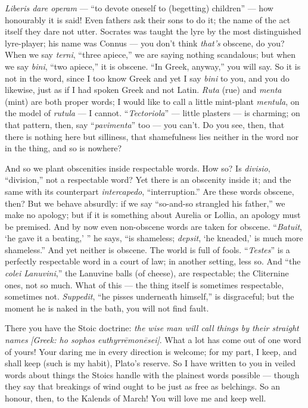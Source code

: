  \textit{Liberis dare operam} --- ``to devote oneself to (begetting) children'' --- how honourably it is said! Even fathers ask their sons to do it; the name of the act itself they dare not utter. Socrates was taught the lyre by the most distinguished lyre-player; his name was Connus --- you don't think \emph{that's} obscene, do you? When we say \textit{terni}, ``three apiece,'' we are saying nothing scandalous; but when we say \textit{bini}, ``two apiece,'' it is obscene. ``In Greek, anyway,'' you will say. So it is not in the word, since I too know Greek and yet I say \textit{bini} to you, and you do likewise, just as if I had spoken Greek and not Latin. \textit{Ruta} (rue) and \textit{menta} (mint) are both proper words; I would like to call a little mint-plant \textit{mentula}, on the model of \textit{rutula} --- I cannot. ``\textit{Tectoriola}'' --- little plasters --- is charming; on that pattern, then, say ``\textit{pavimenta}'' too --- you can't. Do you see, then, that there is nothing here but silliness, that shamefulness lies neither in the word nor in the thing, and so is nowhere?

 And so we plant obscenities inside respectable words. How so? Is \textit{divisio}, ``division,'' not a respectable word? Yet there is an obscenity inside it; and the same with its counterpart \textit{intercapedo}, ``interruption.'' Are these words obscene, then? But we behave absurdly: if we say ``so-and-so strangled his father,'' we make no apology; but if it is something about Aurelia or Lollia, an apology must be premised. And by now even non-obscene words are taken for obscene. ``\textit{Batuit}, `he gave it a beating,' '' he says, ``is shameless; \textit{depsit}, `he kneaded,' is much more shameless.'' And yet neither is obscene. The world is full of fools. ``\textit{Testes}'' is a perfectly respectable word in a court of law; in another setting, less so. And ``the \textit{colei Lanuvini},'' the Lanuvine balls (of cheese), are respectable; the Cliternine ones, not so much. What of this --- the thing itself is sometimes respectable, sometimes not. \textit{Suppedit}, ``he pisses underneath himself,'' is disgraceful; but the moment he is naked in the bath, you will not find fault.

 There you have the Stoic doctrine: \textit{the wise man will call things by their straight names} \textit{[Greek: ho sophos euthyrr\=emon\=esei]}. What a lot has come out of one word of yours! Your daring me in every direction is welcome; for my part, I keep, and shall keep (such is my habit), Plato's reserve. So I have written to you in veiled words about things the Stoics handle with the plainest words possible --- though they say that breakings of wind ought to be just as free as belchings. So an honour, then, to the Kalends of March! You will love me and keep well.
